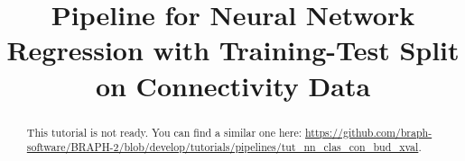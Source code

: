 \documentclass[justified]{tufte-handout}
\title[Regression Training-Test Split Connectivity Data]{Pipeline for Neural Network Regression with Training-Test Split on Connectivity Data}
\begin{document}
\maketitle

\begin{abstract}
\noindent
This tutorial is not ready. You can find a similar one here: \url{https://github.com/braph-software/BRAPH-2/blob/develop/tutorials/pipelines/tut_nn_clas_con_bud_xval}.
\end{abstract}
\end{document}
